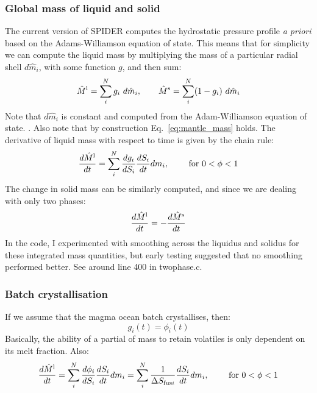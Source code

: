\subsubsection{Global mass of liquid and solid}
The current version of SPIDER computes the hydrostatic pressure profile \emph{a priori} based on the Adams-Williamson equation of state.  This means that for simplicity we can compute the liquid mass by multiplying the mass of a particular radial shell $d\hat{m}_i$, with some function $g$, and then sum:%
\begin{equation}
\hat{M}^{\rm l} = \sum_i^N g_i \ d\hat{m}_i, \qquad \hat{M}^{\rm s} = \sum_i^N (1-g_i) \ d\hat{m}_i
\end{equation}
Note that $d\hat{m}_i$ is constant and computed from the Adam-Williamson equation of state.  .  Also note that by construction Eq.~\ref{eq:mantle_mass} holds.
The derivative of liquid mass with respect to time is given by the chain rule:
\begin{equation}
\frac{d \hat{M}^{\rm l}}{dt} = \sum_i^N \frac{d g_i}{d S_i} \frac{dS_i}{dt} dm_i, \qquad \text{ for } 0 < \phi < 1
\end{equation}
The change in solid mass can be similarly computed, and since we are dealing with only two phases:
\begin{equation}
\frac{d \hat{M}^{\rm l}}{dt} = -\frac{d \hat{M}^{\rm s}}{dt}
\end{equation}
In the code, I experimented with smoothing across the liquidus and solidus for these integrated mass quantities, but early testing suggested that no smoothing performed better. See around line 400 in twophase.c.
\subsubsection{Batch crystallisation}
If we assume that the magma ocean batch crystallises, then:
\begin{equation}
g_i(t) = \phi_i(t)
\end{equation}
Basically, the ability of a partial of mass to retain volatiles is only dependent on its melt fraction.  Also:
\begin{equation}
\frac{d \hat{M}^{\rm l}}{dt} = \sum_i^N \frac{d \phi_i}{d S_i} \frac{dS_i}{dt} dm_i = \sum_i^N \frac{1}{\Delta S_{{\rm fus}i}} \frac{dS_i}{dt} dm_i, \qquad \text{ for } 0 < \phi < 1
\end{equation}
